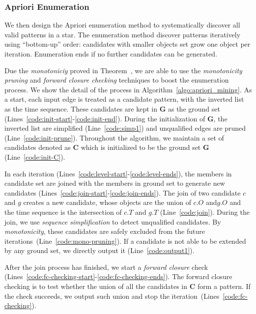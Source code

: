 \subsubsection{Apriori Enumeration}
We then design the Apriori enumeration method to
systematically discover all valid patterns in a star.
The enumeration method discover patterns iteratively using ``bottom-up'' order:
candidates with smaller objects set grow one object per iteration.
%
%
Enumeration ends if no
further candidates can be generated.

 Due the \emph{monotoniciy} proved in Theorem~\label{THM:SPARE_MONO}, we are able to use the \emph{monotonicity pruning} and \emph{forward closure checking} techniques to boost the enumeration process. We show the detail of the process
in Algorithm~\ref{algo:apriori_mining}. As a start, 
each input edge is treated as a candidate pattern, with the 
inverted list as the time sequence. These candidates
are kept in $\mathbf{G}$ as the ground set (Lines~\ref{code:init-start}-\ref{code:init-end}). During the initialization of $\mathbf{G}$, the inverted list are simplified (Line~\ref{code:simp1}) and unqualified edges are pruned (Line~\ref{code:init-prune}). Throughout the algorithm, we maintain a set of candidates denoted as $\mathbf{C}$ which is initialized to be the ground set $\mathbf{G}$ (Line~\ref{code:init-C}). 

In each iteration (Lines~\ref{code:level-start}-\ref{code:level-ends}),  the members in candidate set are joined with the members in ground set to generate new candidates (Lines~\ref{code:join-start}-\ref{code:join-ends}). The join of two candidate $c$ and $g$ creates a 
new candidate, whose objects are the union of $c.O$ and$g.O$ and the time sequence is the intersection of $c.T$ and $g.T$ (Line~\ref{code:join}). During the join, we use \emph{sequence simplification} to detect unqualified candidates. By \emph{monotonicity}, these candidates are safely excluded from the future iterations~(Line~\ref{code:mono-pruning}). If a candidate is not able to be extended by any ground set, we directly output it (Line~\ref{code:output1}). 

After the join process has finished, we start a \emph{forward closure} check (Lines~\ref{code:fc-checking-start}-\ref{code:fc-checking-ends}). The forward closure checking is to test whether the union of all the candidates in $\mathbf{C}$ form a pattern. If the check succeeds, we output such union and stop the iteration~(Lines~\ref{code:fc-checking}).

